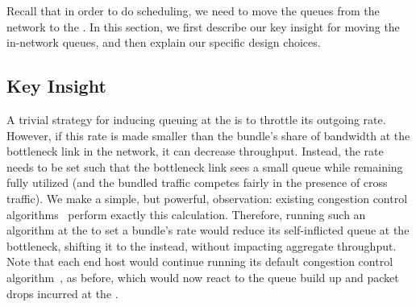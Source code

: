 
Recall that in order to do scheduling, we need to move the queues from the network to the \name. 
In this section, we first describe our key insight for moving the in-network queues, and then explain our specific design choices. 

\subsection{Key Insight}


A trivial strategy for inducing queuing at the \name is to throttle its outgoing rate. However, if this rate is made smaller than the bundle's share of bandwidth at the bottleneck link in the network, it can decrease throughput. Instead, the rate needs to be set such that the bottleneck link sees a small queue while remaining fully utilized (and the bundled traffic competes fairly in the presence of cross traffic). We make a simple, but powerful, observation: existing congestion control algorithms~\cite{nimbus, copa} perform exactly this calculation. Therefore, running such an algorithm at the \inbox to set a bundle's rate would reduce its self-inflicted queue at the bottleneck, shifting it to the \inbox instead, without impacting aggregate throughput. Note that each end host would continue running its default congestion control algorithm~\cite{cubic, bbr}, as before, which would now react to the queue build up and packet drops incurred at the \inbox.


